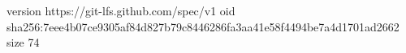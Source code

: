 version https://git-lfs.github.com/spec/v1
oid sha256:7eee4b07ce9305af84d827b79c8446286fa3aa41e58f4494be7a4d1701ad2662
size 74
